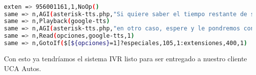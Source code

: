\begin{lstlisting}[language=bash,title={(/etc/asterisk/extensions.conf}]

exten => 956001161,1,NoOp()
same => n,AGI(asterisk-tts.php,"Si quiere saber el tiempo restante de su garantia marque el 1")
same => n,Playback(google-tts)
same => n,AGI(asterisk-tts.php,"en otro caso, espere y le pondremos con un operador")
same => n,Read(opciones,google-tts,1)
same => n,GotoIf($[${opciones}=1]?especiales,105,1:extensiones,400,1)

\end{lstlisting}

Con esto ya tendríamos el sistema IVR listo para ser entregado a nuestro cliente UCA Autos.

